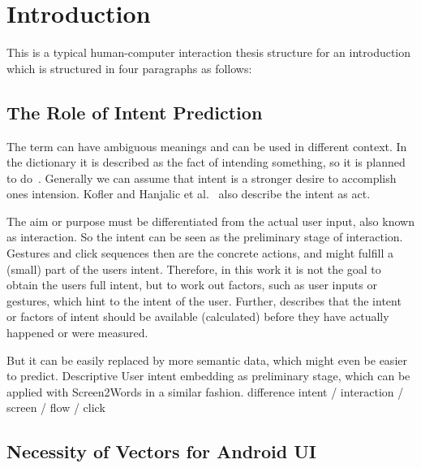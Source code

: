 \chapter{Introduction}
\label{sec:introduction}

This is a typical human-computer interaction thesis structure for an introduction which is structured in four paragraphs as follows:

\section{The Role of Intent Prediction}
\label{sec:role-intent-prediction}

The term  can have ambiguous meanings and can be used in different context.
In the dictionary it is described as the fact of intending something, so it is planned to do~\cite{dictionaryIntent}.
Generally we can assume that intent is a stronger desire to accomplish ones intension.
Kofler and Hanjalic et al.~\cite{kofler2016user} also describe the intent as  act.

The aim or purpose must be differentiated from the actual user input, also known as interaction.
So the intent can be seen as the preliminary stage of interaction.
Gestures and click sequences then are the concrete actions, and might fulfill a (small) part of the users intent.
Therefore, in this work it is not the goal to obtain the users full intent, but to work out factors, such as user inputs or gestures, which hint to the intent of the user.
Further,  describes that the intent or factors of intent should be available (calculated) before they have actually happened or were measured.


But it can be easily replaced by more semantic data, which might even be easier to predict.
Descriptive User intent embedding as preliminary stage, which can be applied with Screen2Words\cite{wang2021screen2words} in a similar fashion.
difference intent / interaction / screen / flow / click


\section{Necessity of Vectors for Android UI}
\label{sec:necessity-of-vectors-for-android-ui}


